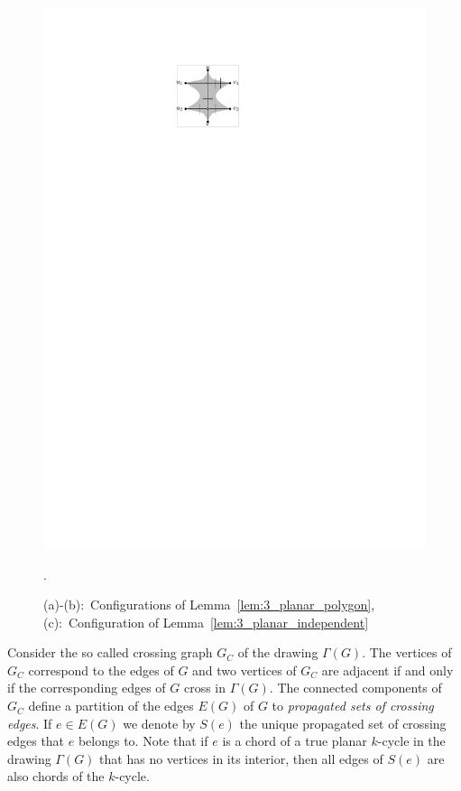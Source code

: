 \begin{figure}[htb]
\begin{minipage}[b]{.24\textwidth}
        \includegraphics[width=\textwidth,page=1]{images/3planar_independent}
        \subcaption{~}\label{fig:3_planar_independent}
    \end{minipage}
    \caption{%
    (a)-(b):~Configurations of Lemma~\ref{lem:3_planar_polygon}, (c):~Configuration of Lemma~\ref{lem:3_planar_independent}}.
    \label{fig:3_planar_polygon}
\end{figure}


Consider the so called crossing graph $G_C$ of the drawing $\Gamma(G)$. The vertices of $G_C$ correspond to the edges of $G$ and two vertices of $G_C$ are adjacent if and only if the corresponding edges of $G$ cross in $\Gamma(G)$. The connected components of $G_C$ define a partition of the edges $E(G)$ of $G$ to \emph{propagated sets of crossing edges}. If $e\in E(G)$ we denote by $S(e)$ the unique propagated set of crossing edges that $e$ belongs to. Note that if $e$ is a chord of a true planar $k$-cycle in the drawing $\Gamma(G)$ that has no vertices in its interior, then all edges of $S(e)$ are also chords of the $k$-cycle.

